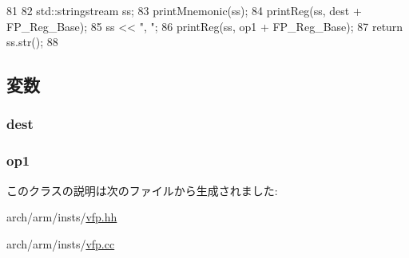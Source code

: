 \begin{DoxyCode}
81 {
82     std::stringstream ss;
83     printMnemonic(ss);
84     printReg(ss, dest + FP_Reg_Base);
85     ss << ", ";
86     printReg(ss, op1 + FP_Reg_Base);
87     return ss.str();
88 }
\end{DoxyCode}


\subsection{変数}
\hypertarget{classArmISA_1_1FpRegRegOp_aec72e8e45bdc87abeeeb75d2a8a9a716}{
\subsubsection[{dest}]{ {\bf dest}}}
\label{classArmISA_1_1FpRegRegOp_aec72e8e45bdc87abeeeb75d2a8a9a716}
\hypertarget{classArmISA_1_1FpRegRegOp_a4c465c43ad568f8bcf8ae71480e9cfea}{
\subsubsection[{op1}]{ {\bf op1}}}
\label{classArmISA_1_1FpRegRegOp_a4c465c43ad568f8bcf8ae71480e9cfea}


このクラスの説明は次のファイルから生成されました:\begin{DoxyCompactItemize}
\item 
arch/arm/insts/\hyperlink{vfp_8hh}{vfp.hh}\item 
arch/arm/insts/\hyperlink{vfp_8cc}{vfp.cc}\end{DoxyCompactItemize}
